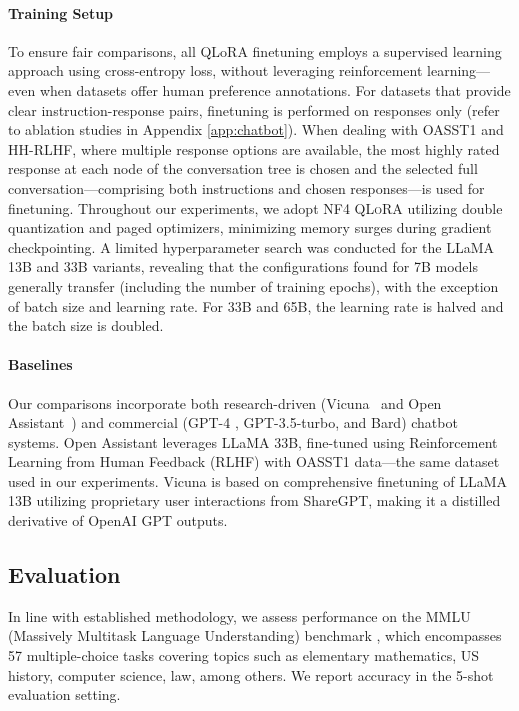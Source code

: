 \paragraph{Training Setup} To ensure fair comparisons, all QLoRA finetuning employs a supervised learning approach using cross-entropy loss, without leveraging reinforcement learning—even when datasets offer human preference annotations. For datasets that provide clear instruction-response pairs, finetuning is performed on responses only (refer to ablation studies in Appendix \ref{app:chatbot}). When dealing with OASST1 and HH-RLHF, where multiple response options are available, the most highly rated response at each node of the conversation tree is chosen and the selected full conversation—comprising both instructions and chosen responses—is used for finetuning. Throughout our experiments, we adopt NF4 \textsc{QLoRA} utilizing double quantization and paged optimizers, minimizing memory surges during gradient checkpointing. A limited hyperparameter search was conducted for the LLaMA 13B and 33B variants, revealing that the configurations found for 7B models generally transfer (including the number of training epochs), with the exception of batch size and learning rate. For 33B and 65B, the learning rate is halved and the batch size is doubled.

\paragraph{Baselines} Our comparisons incorporate both research-driven (Vicuna~\citep{vicuna2023} and Open Assistant~\citep{kopf2023openassistant}) and commercial (GPT-4 \citep{openai2023gpt}, GPT-3.5-turbo, and Bard) chatbot systems. Open Assistant leverages LLaMA 33B, fine-tuned using Reinforcement Learning from Human Feedback (RLHF) with OASST1 data—the same dataset used in our experiments. Vicuna is based on comprehensive finetuning of LLaMA 13B utilizing proprietary user interactions from ShareGPT, making it a distilled derivative of OpenAI GPT outputs.

\subsection{Evaluation}

In line with established methodology, we assess performance on the MMLU (Massively Multitask Language Understanding) benchmark \citep{hendrycksmeasuring}, which encompasses 57 multiple-choice tasks covering topics such as elementary mathematics, US history, computer science, law, among others. We report accuracy in the 5-shot evaluation setting.

